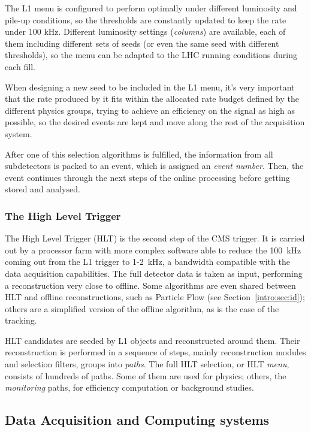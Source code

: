 \documentclass[../main.tex]{subfiles}
\begin{document}
The L1 menu is configured to perform optimally under different luminosity and pile-up conditions, so the thresholds are constantly updated to keep the rate under 100 kHz. Different luminosity settings (\textit{columns}) are available, each of them including different sets of seeds (or even the same seed with different thresholds), so the menu can be adapted to the LHC running conditions during each fill.

When designing a new seed to be included in the L1 menu, it's very important that the rate produced by it fits within the allocated rate budget defined by the different physics groups, trying to achieve an efficiency on the signal as high as possible, so the desired events are kept and move along the rest of the acquisition system.

After one of this selection algorithms is fulfilled, the information from all subdetectors is packed to an event, which is assigned an \textit{event number}. Then, the event continues through the next steps of the online processing before getting stored and analysed.

\subsubsection{The High Level Trigger}

The High Level Trigger (HLT) is the second step of the CMS trigger. It is carried out by a processor farm with more complex software able to reduce the 100~kHz coming out from the L1 trigger to 1-2~kHz, a bandwidth compatible with the data acquisition capabilities. The full detector data is taken as input, performing a reconstruction very close to offline. Some algorithms are even shared between HLT and offline reconstructions, such as Particle Flow (see Section~\ref{intro:sec:id}); others are a simplified version of the offline algorithm, as is the case of the tracking.

HLT candidates are seeded by L1 objects and reconstructed around them. Their reconstruction is performed in a sequence of steps, mainly reconstruction modules and selection filters, groups into \textit{paths}. The full HLT selection, or HLT \textit{menu}, consists of hundreds of paths. Some of them are used for physics; others, the \textit{monitoring} paths, for efficiency computation or background studies.

\subsection{Data Acquisition and Computing systems}
\end{document}
